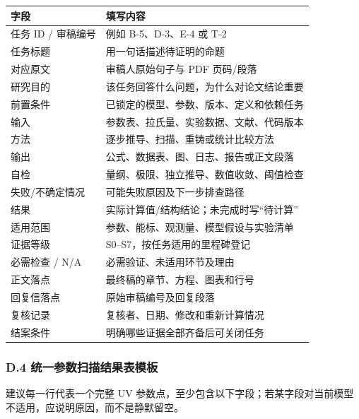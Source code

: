 \documentclass[
  chinese,
  UTF8]{ctexart}
\newcounter{none} %
\begin{document}
{\def\LTcaptype{none} %
\begin{longtable}[]{@{}ll@{}}
\toprule\noalign{}
字段 & 填写内容 \\
\midrule\noalign{}
\endhead
\bottomrule\noalign{}
\endlastfoot
任务 ID / 审稿编号 & 例如 B-5、D-3、E-4 或 T-2 \\
任务标题 & 用一句话描述待证明的命题 \\
对应原文 & 审稿人原始句子与 PDF 页码/段落 \\
研究目的 & 该任务回答什么问题，为什么对论文结论重要 \\
前置条件 & 已锁定的模型、参数、版本、定义和依赖任务 \\
输入 & 参数表、拉氏量、实验数据、文献、代码版本 \\
方法 & 逐步推导、扫描、重铸或统计比较方法 \\
输出 & 公式、数据表、图、日志、报告或正文段落 \\
自检 & 量纲、极限、独立推导、数值收敛、阈值检查 \\
失败/不确定情况 & 可能失败原因及下一步排查路径 \\
结果 & 实际计算值/结构结论；未完成时写``待计算'' \\
适用范围 & 参数、能标、观测量、模型假设与实验清单 \\
证据等级 & S0--S7，按任务适用的里程碑登记 \\
必需检查 / N/A & 必需验证、未适用环节及理由 \\
正文落点 & 最终稿的章节、方程、图表和行号 \\
回复信落点 & 原始审稿编号及回复段落 \\
复核记录 & 复核者、日期、修改和重新计算情况 \\
结案条件 & 明确哪些证据全部齐备后可关闭任务 \\
\end{longtable}
}

\subsubsection{D.4
统一参数扫描结果表模板}\label{d.4-ux7edfux4e00ux53c2ux6570ux626bux63cfux7ed3ux679cux8868ux6a21ux677f}

建议每一行代表一个完整 UV
参数点，至少包含以下字段；若某字段对当前模型不适用，应说明原因，而不是静默留空。
\end{document}
